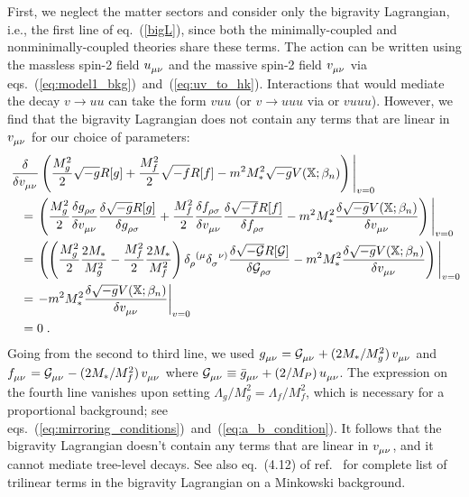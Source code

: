 \documentclass[11pt,a4paper]{article}
\newcommand{\bes}[1]{\begin{equation}\begin{split} #1 \end{split}\end{equation}}
\newcommand{\Mpl}{M_P}
\newcommand{\eref}[1]{eq.~(\ref{#1})}
\newcommand{\erefs}[2]{eqs.~(\ref{#1})~and~(\ref{#2})}
\newcommand{\rref}[1]{ref.~\cite{#1}}
\begin{document}
\begin{appendix}
First, we neglect the matter sectors and consider only the bigravity Lagrangian, i.e., the first line of \eref{bigL}, since both the minimally-coupled and nonminimally-coupled theories share these terms.  The action can be written using the massless spin-2 field $u\indices{_\mu_\nu}$ and the massive spin-2 field $v\indices{_\mu_\nu}$ via \erefs{eq:model1_bkg}{eq:uv_to_hk}.  Interactions that would mediate the decay $v \to uu$ can take the form $vuu$ (or $v \to uuu$ via or $vuuu$).  However, we find that the bigravity Lagrangian does not contain any terms that are linear in $v\indices{_\mu_\nu}$ for our choice of parameters: 
\bes{
    & \eval{ \fdv{v\indices{_\mu_\nu}} \left( \frac{M_g^2}{2}\sqrt{-g}R[g] + \frac{M_f^2}{2}\sqrt{-f}R[f] - m^2 M_*^2 \sqrt{-g} V(\mathbb{X}; \beta_n) \right) }_{v=0} 
    \\ & \quad 
    = \eval{ \left(
    \frac{M_g^2}{2} \fdv{g\indices{_\rho_\sigma}}{v\indices{_\mu_\nu}} \fdv{\sqrt{-g}R[g]}{g\indices{_\rho_\sigma}} 
    + \frac{M_f^2}{2} \fdv{f\indices{_\rho_\sigma}}{v\indices{_\mu_\nu}} \fdv{\sqrt{-f}R[f]}{f\indices{_\rho_\sigma}}
    - m^2 M_*^2 \fdv{\sqrt{-g} V(\mathbb{X}; \beta_n)}{v\indices{_\mu_\nu}}
    \right) }_{v=0} 
    \\ & \quad 
    = \eval{ \left(
    \left(\frac{M_g^2}{2}\frac{2M_*}{M_g^2} - \frac{M_f^2}{2}\frac{2M_*}{M_f^2}\right) \delta\indices{_\rho^{(\mu}} \delta\indices{_\sigma^{\nu)}} \fdv{\sqrt{-\mathcal{G}}R[\mathcal{G}]}{\mathcal{G}\indices{_\rho_\sigma}}
    - m^2 M_*^2 \fdv{\sqrt{-g} V(\mathbb{X}; \beta_n)}{v\indices{_\mu_\nu}}
    \right) }_{v=0} 
    \\ & \quad 
    = \eval{
    - m^2 M_*^2 \fdv{\sqrt{-g} V(\mathbb{X}; \beta_n)}{v\indices{_\mu_\nu}}
    }_{v=0} 
    \\ & \quad 
    = 0
    \;.
}
Going from the second to third line, we used $g\indices{_\mu_\nu} = \mathcal{G}\indices{_\mu_\nu} + (2M_*/M_g^2) \, v\indices{_\mu_\nu}$ and $f\indices{_\mu_\nu} = \mathcal{G}\indices{_\mu_\nu} - (2M_*/M_f^2) \, v\indices{_\mu_\nu}$ where $\mathcal{G}\indices{_\mu_\nu} \equiv \bar{g}\indices{_\mu_\nu} + (2/\Mpl) \, u\indices{_\mu_\nu}$.  The expression on the fourth line vanishes upon setting $\Lambda_g / M_g^2 = \Lambda_f / M_f^2$, which is necessary for a proportional background; see \erefs{eq:mirroring_conditions}{eq:a_b_condition}.  
It follows that the bigravity Lagrangian doesn't contain any terms that are linear in $v\indices{_\mu_\nu}$, and it cannot mediate tree-level decays.  See also eq.~(4.12) of \rref{Bonifacio:2017nnt} for complete list of trilinear terms in the bigravity Lagrangian on a Minkowski background.


\end{appendix}
\end{document}

